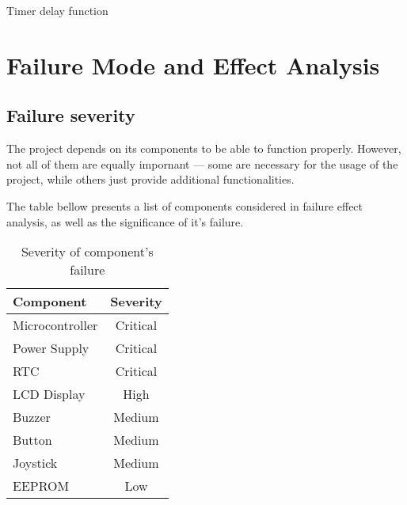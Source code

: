 \documentclass[10pt]{article}
\newcommand{\code}[3]{}
\begin{document}
    \begin{program}[H]
        \code{11}{19}{timer.h}
        \caption{Timer delay function}
    \end{program}

    \section{Failure Mode and Effect Analysis}

    \subsection{Failure severity}

    The project depends on its components to be able to function properly.
    However, not all of them are equally impornant --- some are necessary for the usage of the project,
    while others just provide additional functionalities.

    The table bellow presents a list of components considered in failure effect analysis, as well as the significance of it's failure.

    \begin{table}[H]\centering
        \newcommand{\critical}{\color{red} Critical}
        \begin{tabular}{|l|c|}
            \hline
            \bf Component   &   \bf Severity                \\\hline
            Microcontroller &   \critical                   \\\hline
            Power Supply    &   \critical\footnotemark      \\\hline
            RTC             &   \critical                   \\\hline
            LCD Display     &   High                        \\\hline
            Buzzer          &   Medium                      \\\hline
            Button          &   Medium                      \\\hline
            Joystick        &   Medium                      \\\hline
            EEPROM          &   Low                         \\\hline
        \end{tabular}
        \caption{Severity of component's failure}
    \end{table}
\end{document}
